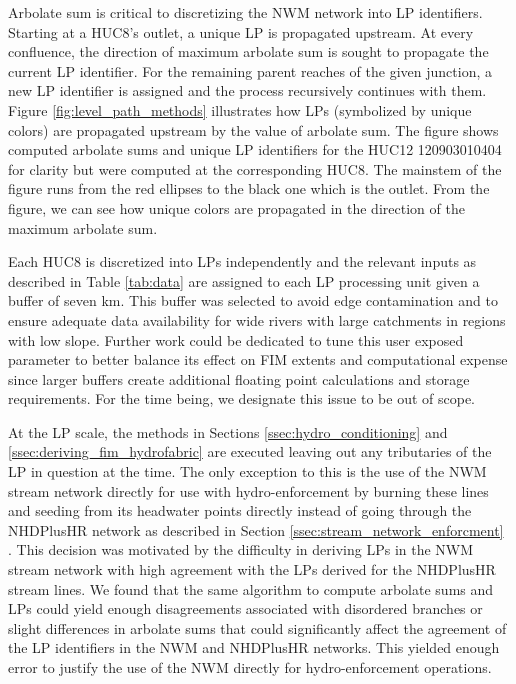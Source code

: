 \documentclass[draft]{dependencies/agujournal2019}
\begin{document}
Arbolate sum is critical to discretizing the NWM network into LP identifiers.
Starting at a HUC8's outlet, a unique LP is propagated upstream. 
At every confluence, the direction of maximum arbolate sum is sought to propagate the current LP identifier.
For the remaining parent reaches of the given junction, a new LP identifier is assigned and the process recursively continues with them.
Figure \ref{fig:level_path_methods} illustrates how LPs (symbolized by unique colors) are propagated upstream by the value of arbolate sum.
The figure shows computed arbolate sums and unique LP identifiers for the HUC12 120903010404 for clarity but were computed at the corresponding HUC8.
The mainstem of the figure runs from the red ellipses to the black one which is the outlet.
From the figure, we can see how unique colors are propagated in the direction of the maximum arbolate sum.

Each HUC8 is discretized into LPs independently and the relevant inputs as described in Table \ref{tab:data} are assigned to each LP processing unit given a buffer of seven km.
This buffer was selected to avoid edge contamination \cite{lindsay2013measuring} and to ensure adequate data availability for wide rivers with large catchments in regions with low slope.
Further work could be dedicated to tune this user exposed parameter to better balance its effect on FIM extents and computational expense since larger buffers create additional floating point calculations and storage requirements.
For the time being, we designate this issue to be out of scope.

At the LP scale, the methods in Sections \ref{ssec:hydro_conditioning} and \ref{ssec:deriving_fim_hydrofabric} are executed leaving out any tributaries of the LP in question at the time.
The only exception to this is the use of the NWM stream network directly for use with hydro-enforcement by burning these lines and seeding from its headwater points directly instead of going through the NHDPlusHR network as described in Section \ref{ssec:stream_network_enforcment} .
This decision was motivated by the difficulty in deriving LPs in the NWM stream network with high agreement with the LPs derived for the NHDPlusHR stream lines.
We found that the same algorithm to compute arbolate sums and LPs could yield enough disagreements associated with disordered branches or slight differences in arbolate sums that could significantly affect the agreement of the LP identifiers in the NWM and NHDPlusHR networks.
This yielded enough error to justify the use of the NWM directly for hydro-enforcement operations.
\end{document}
